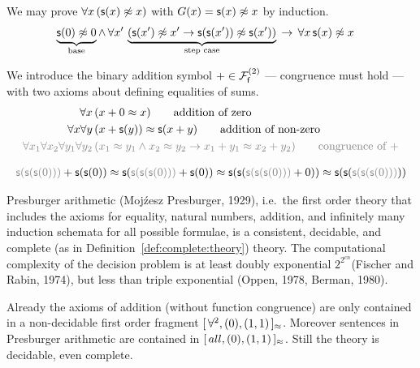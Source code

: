 \begin{example}
	We may prove \( \forall x\, (\msucc(x) \mNE x) \) with \( G(x) = \msucc(x) \mNE x \) by induction.
	\begin{align*}
		\underbrace{\msucc(0)\mNE 0}_{\text{base}}
		\land \, \forall x' \, &
		\underbrace{
			\left( \msucc(x')\mNE x' \limp \msucc(\msucc(x'))\mNE \msucc(x') \right)
		}_{\text{step case}}
		\, \limp \, \forall x \, \msucc(x)\mNE x
		\end{align*}
\end{example}

\begin{definition}
	[Addition]\label{def:addition:axioms}
	We introduce the binary addition symbol \( +\in\mcFfn[2] \)
	--- congruence must hold ---
	with two axioms about defining equalities of sums.
\begin{align*}
\forall x\,
&(x+0 \mEQ x)
\tag*{addition of zero}\\
\forall x\forall y\,
&(x+\msucc(y)) \mEQ \msucc(x+y)
\tag*{addition of non-zero}
\\
\colG\forall x_1\forall x_2\forall y_1\forall y_2\,
&\colG (x_1\mEQ y_1\land x_2\mEQ y_2 \limp x_1+y_1\mEQ x_2+y_2)
\tag*{congruence of \( + \)}
\end{align*}
\end{definition}

\begin{example}
	\begin{gather*}
	{\colG \msucc(\msucc(\msucc(0)))} + \msucc(\msucc(0))
	\mEQ\msucc({\colG \msucc(\msucc(\msucc(0)))} + \msucc(0))
	\mEQ \msucc(\msucc(
	{\colG \msucc(\msucc(\msucc(0)))} + 0))
	\mEQ \msucc(\msucc(
	{\colG \msucc(\msucc(\msucc(0)))}))
	\end{gather*}
\end{example}

\begin{theorem}Presburger arithmetic (Moj\'{z}esz Presburger, 1929), i.e.\ the first order theory that includes the axioms for equality, natural numbers, addition, and 
	infinitely many induction schemata for all possible formulae, is a consistent, decidable, and complete (as in Definition~\vref{def:complete:theory}) theory. 
	The computational complexity of the decision problem is at least doubly exponential \( 2^{2^{cn}} \)(Fischer and Rabin, 1974), but less than triple exponential (Oppen, 1978, Berman, 1980).
\end{theorem}

\begin{remark}
	Already the axioms of addition (without function congruence)
	are only contained in a non-decidable first order fragment
	\( [ \, \forall^2 , (0), (1,1) \, ]{}_{\mEQ} \). Moreover
	sentences in Presburger arithmetic are contained in
	\( [ \, all , (0), (1,1) \, ]{}_{\mEQ} \).
	Still the theory is decidable, even complete.
\end{remark}

